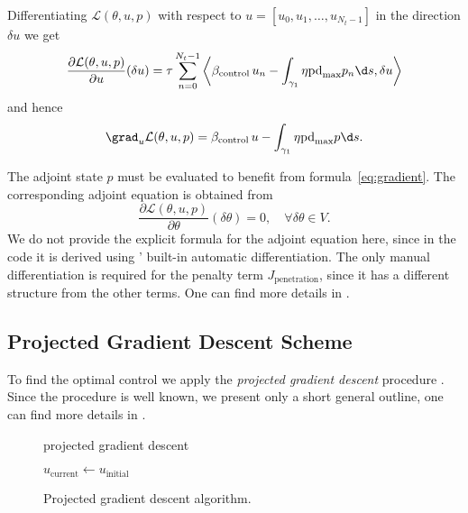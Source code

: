 Differentiating $\mathcal{L}(\theta,u,p)$ with respect to $u = [u_0, u_1, \ldots, u_{N_t-1}]$ in the direction $\delta u$ we get
\begin{equation}
	\frac{\partial \mathcal{L}(\theta,u,p)}{\partial u} (\delta u)
	=
	\tau \sum_{n=0}^{N_t-1}
	\left\langle
		\beta_\text{control}\, u_n - \int_{\gamma_1} \eta \text{pd}_{\max} p_n\d s, \delta u
	\right\rangle
\end{equation}
and hence
\begin{equation} \label{eq:gradient}
	\grad_u \mathcal{L}(\theta, u, p) = \beta_\text{control}\, u - \int_{\gamma_1} \eta \text{pd}_{\max} p\d s.
\end{equation}

The adjoint state $p$ must be evaluated to benefit from formula~\eqref{eq:gradient}. The corresponding adjoint equation is obtained from
\begin{equation}
	\frac{\partial \mathcal{L}(\theta,u,p)}{\partial \theta} (\delta \theta)
	= 0, \quad \forall \delta \theta \in V.
\end{equation}
We do not provide the explicit formula for the adjoint equation here, since in the code it is derived using \fenics' built-in automatic differentiation.
The only manual differentiation is required for the penalty term $J_\text{penetration}$, since it has a different structure from the other terms.
One can find more details in \cite[\texttt{optipuls.core}]{optipuls_github}.


\subsection{Projected Gradient Descent Scheme}

To find the optimal control we apply the \emph{projected gradient descent} procedure . Since the procedure is well known, we present only a short general outline, one can find more details in \cite[\texttt{optipuls.optimization}]{optipuls_github}.

\begin{figure}
	\begin{algorithm}[H]
	\caption{projected gradient descent}
	\DontPrintSemicolon
	$u_\text{current} \gets u_\text{initial}$\;
	\end{algorithm}
	\caption{Projected gradient descent algorithm.}
\end{figure}


